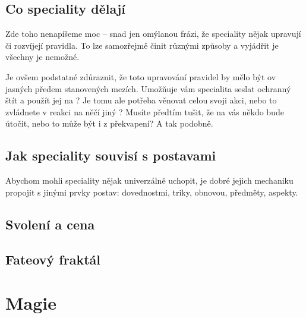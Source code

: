 \documentclass[../main.tex]{subfiles}
\begin{document}
\subsection{Co speciality dělají}
\label{sec:spec-delaji}
Zde toho nenapíšeme moc – snad jen omýlanou frázi, že speciality nějak upravují či
rozvíjejí pravidla. To lze samozřejmě činit různými způsoby a vyjádřit je všechny je nemožné.

Je ovšem podstatné zdůraznit, že toto upravování pravidel by mělo být ov jasných předem
stanovených mezích. Umožňuje vám specialita seslat ochranný štít a použít jej na
? Je tomu ale potřeba věnovat celou svoji akci, nebo to zvládnete v reakci na
něčí jiný ? Musíte předtím tušit, že na vás někdo bude útočit, nebo to může být
i z překvapení? A tak podobně.

\subsection{Jak speciality souvisí s postavami}
\label{sec:spec-postavy}
Abychom mohli speciality nějak univerzálně uchopit, je dobré jejich mechaniku propojit s
jinými prvky postav: dovednostmi, triky, obnovou, předměty, aspekty.

\subsection{Svolení a cena}
\label{sec:spec-svolenicena}

\subsection{Fateový fraktál}
\label{sec:spec-fraktal}

\section{Magie}
\label{sec:magie}
\end{document}
